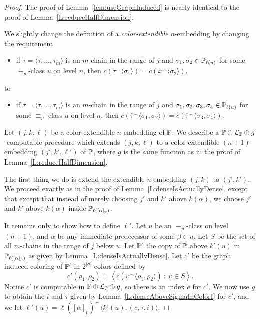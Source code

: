 \begin{proof}
The proof of Lemma~\ref{lem:useGraphInduced} is nearly
identical to the proof of Lemma~\ref{L:reduceHalfDimension}.

We slightly change the definition of a \textit{color-extendible} $n$-embedding
by changing the requirement
\begin{itemize}
\item if $\overline{\tau}=\langle \tau,\ldots,\tau_m\rangle$ is an $m$-chain in the range of $j$
	and $\sigma_1,\sigma_2\in\mathbb{P}_{\ell(u)}$ for some $\equiv_p$-class $u$ on level $n$,
	then $c(\overline{\tau}^\frown\langle\sigma_1\rangle)=c(\overline{x}^\frown\langle\sigma_2\rangle)$.
\end{itemize}
to
\begin{itemize}
\item if $\overline{\tau}=\langle \tau,\ldots,\tau_m\rangle$ is an $m$-chain in the range of $j$
	and $\sigma_1,\sigma_2,\sigma_3,\sigma_4\in\mathbb{P}_{\ell(u)}$ for some $\equiv_p$-class $u$ on level $n$,
	then $c(\overline{\tau}^\frown\langle\sigma_1,\sigma_2\rangle)=c(\overline{\tau}^\frown\langle\sigma_3,\sigma_4\rangle)$.
\end{itemize}

Let $(j,k,\ell)$ be a color-extendible $n$-embedding of $\mathbb{P}$.
We describe a $\mathbb{P}\oplus\mathcal{L}_{\mathbb{P}}\oplus g$-computable procedure which extends $(j,k,\ell)$ to a
color-extendible $(n+1)$-embedding $(j',k',\ell')$ of $\mathbb{P}$,
where $g$ is the same function as in the proof of Lemma~\ref{L:reduceHalfDimension}.

The first thing we do is
extend the extendible $n$-embedding $(j,k)$ to $(j',k')$.
We proceed exactly as in the proof of Lemma~\ref{L:denseIsActuallyDense},
except that except that instead of merely choosing $j'$ and $k'$
above $k(\alpha)$, we choose $j'$ and $k'$ above $k(\alpha)$
inside $\mathbb{P}_{\ell([\alpha]_p)}$.

It remains only to show how to define $\ell'$.
Let $u$ be an $\equiv_p$-class on level $(n+1)$,
and $\alpha$ be any immediate predecessor of some $\beta\in u$.
Let $S$ be the set of all $m$-chains in the range of $j$ below $u$.
Let $\mathbb{P}'$ the copy of $\mathbb{P}$ above $k'(u)$ in $\mathbb{P}_{\ell([\alpha]_p)}$ as given by Lemma~\ref{L:denseIsActuallyDense}.
Let $c'$ be the graph induced coloring of $\mathbb{P}'$ in $2^{|S|}$ colors
defined by
$$c'(\rho_1,\rho_2)=\left\langle c(\overline{\upsilon}^\frown\langle\rho_1,\rho_2\rangle)\ :\ \overline{\upsilon}\in S\right\rangle.$$
Notice $c'$ is computable in $\mathbb{P}\oplus\mathcal{L}_{\mathbb{P}}\oplus g$,
so there is an index $e$ for $c'$.
We now use $g$ to obtain the $i$ and $\tau$ given by Lemma~\ref{L:denseAboveSigmaInColorI} for $c'$,
and we let $\ell'(u)=\ell([\alpha]_p)^\frown\langle k'(u),(e,\tau,i)\rangle$.


\end{proof}
